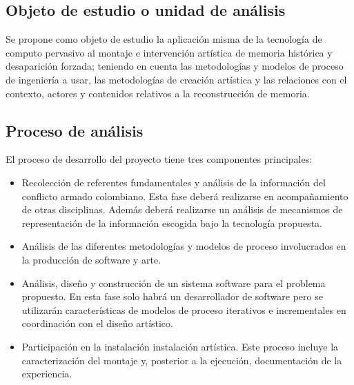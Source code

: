 \subsection{Objeto de estudio o unidad de análisis}

Se propone como objeto de estudio la aplicación misma de la tecnología de computo pervasivo al montaje e intervención artística de memoria histórica y desaparición forzada; teniendo en cuenta las metodologías y modelos de proceso de ingeniería a usar, las metodologías de creación artística y las relaciones con el contexto, actores y contenidos relativos a la reconstrucción de memoria.

\subsection{Proceso de análisis}

El proceso de desarrollo del proyecto tiene tres componentes principales:
\begin{itemize}
    \item Recolección de referentes fundamentales y análisis de la información del conflicto armado colombiano. Esta fase deberá realizarse en acompañamiento de otras disciplinas. Además deberá realizarse un análisis de mecanismos de representación de la información escogida bajo la tecnología propuesta.
    \item Análisis de las diferentes metodologías y modelos de proceso involucrados en la producción de software y arte.
    \item Análisis, diseño y construcción de un sistema software para el problema propuesto. En esta fase solo habrá un desarrollador de software pero se utilizarán características de modelos de proceso iterativos e incrementales en coordinación con el diseño artístico.
    \item Participación en la instalación instalación artística. Este proceso incluye la caracterización del montaje y, posterior a la ejecución, documentación de la experiencia.
\end{itemize}
